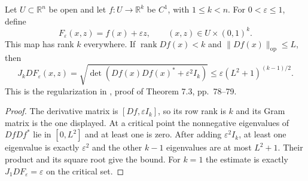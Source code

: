 \begin{lemma}\label{lem:critical-coarea-regularization-jacobian}
Let $U\subset\mathbb R^n$ be open and let $f:U\to\mathbb R^k$ be $C^1$, with $1\leq k<n$. For $0<\varepsilon\leq1$, define
\[
 F_\varepsilon(x,z)=f(x)+\varepsilon z,
 \qquad (x,z)\in U\times(0,1)^k.
\]
This map has rank $k$ everywhere. If $\operatorname{rank}Df(x)<k$ and $\|Df(x)\|_{\mathrm{op}}\leq L$, then
\[
 J_kDF_\varepsilon(x,z)
 =\sqrt{\det(Df(x)Df(x)^*+\varepsilon^2I_k)}
 \leq\varepsilon(L^2+1)^{(k-1)/2}.
\]
This is the regularization in \cite{Sim18}, proof of Theorem 7.3, pp.~78--79.
\end{lemma}
\begin{proof}
The derivative matrix is $[Df,\varepsilon I_k]$, so its row rank is $k$ and its Gram matrix is the one displayed. At a critical point the nonnegative eigenvalues of $DfDf^*$ lie in $[0,L^2]$ and at least one is zero. After adding $\varepsilon^2I_k$, at least one eigenvalue is exactly $\varepsilon^2$ and the other $k-1$ eigenvalues are at most $L^2+1$. Their product and its square root give the bound. For $k=1$ the estimate is exactly $J_1DF_\varepsilon=\varepsilon$ on the critical set.
\end{proof}

